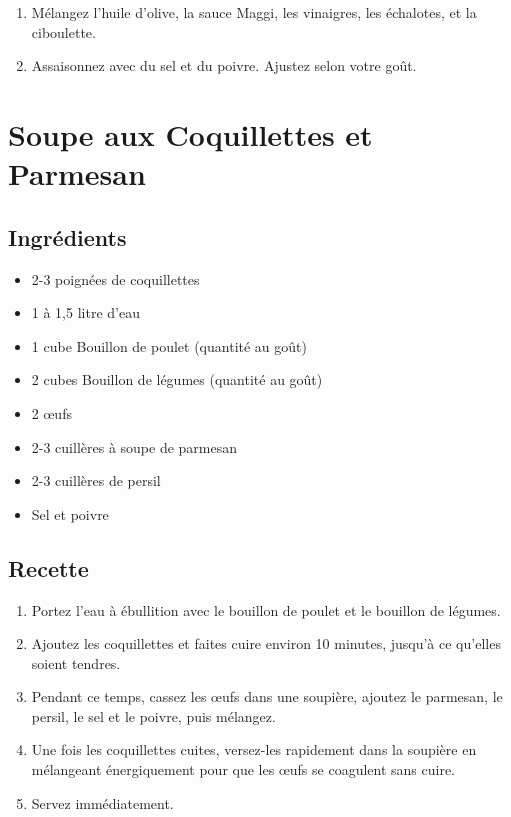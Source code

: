 \begin{enumerate}
\def\labelenumi{\arabic{enumi}.}

\item
  Mélangez l'huile d'olive, la sauce Maggi, les vinaigres, les
  échalotes, et la ciboulette.
\item
  Assaisonnez avec du sel et du poivre. Ajustez selon votre goût.
\end{enumerate}

\section{Soupe aux Coquillettes et
Parmesan}\label{soupe-aux-coquillettes-et-parmesan}

\subsection{Ingrédients}\label{ingruxe9dients-17}

\begin{itemize}

\item
  2-3 poignées de coquillettes
\item
  1 à 1,5 litre d'eau
\item
  1 cube Bouillon de poulet (quantité au goût)
\item
  2 cubes Bouillon de légumes (quantité au goût)
\item
  2 œufs
\item
  2-3 cuillères à soupe de parmesan
\item
  2-3 cuillères de persil
\item
  Sel et poivre
\end{itemize}

\subsection{Recette}\label{recette-11}

\begin{enumerate}
\def\labelenumi{\arabic{enumi}.}

\item
  Portez l'eau à ébullition avec le bouillon de poulet et le bouillon de
  légumes.
\item
  Ajoutez les coquillettes et faites cuire environ 10 minutes, jusqu'à
  ce qu'elles soient tendres.
\item
  Pendant ce temps, cassez les œufs dans une soupière, ajoutez le
  parmesan, le persil, le sel et le poivre, puis mélangez.
\item
  Une fois les coquillettes cuites, versez-les rapidement dans la
  soupière en mélangeant énergiquement pour que les œufs se coagulent
  sans cuire.
\item
  Servez immédiatement.
\end{enumerate}

